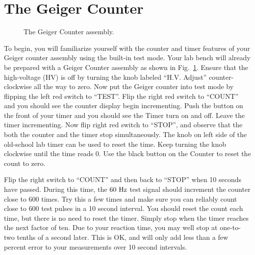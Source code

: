 \section{The Geiger Counter}


\begin{figure}[htbp]
\begin{center}
\caption{\label{fig:geigersetup} The Geiger Counter assembly.}
\end{center}
\end{figure}

To begin, you will familiarize yourself with the counter and timer
features of your Geiger counter assembly using the built-in test mode.
Your lab bench will already be prepared with a Geiger Counter assembly
as shown in Fig.~\ref{fig:geigersetup}.  Ensure that the high-voltage
(HV) is off by turning the knob labeled ``H.V. Adjust''
counter-clockwise all the way to zero.  Now put the Geiger counter
into test mode by flipping the left red switch to ``TEST''.  Flip the
right red switch to ``COUNT'' and you should see the counter display
begin incrementing.  Push the button on the front of your timer and
you should see the Timer turn on and off.  Leave the timer
incrementing.  Now flip right red switch to ``STOP'', and observe that
the both the counter and the timer stop simultaneously.  The knob on
left side of the old-school lab timer can be used to reset the time.
Keep turning the knob clockwise until the time reads 0.  Use the black
button on the Counter to reset the count to zero.

Flip the right switch to ``COUNT'' and then back to ``STOP'' when 10
seconds have passed.  During this time, the $60~\rm Hz$ test signal
should increment the counter close to 600 times.  Try this a few times
and make sure you can reliably count close to $600$ test pulses in a
10 second interval.  You should reset the count each time, but there
is no need to reset the timer.  Simply stop when the timer reaches the
next factor of ten.  Due to your reaction time, you may well stop at
one-to-two tenths of a second later.  This is OK, and will only add
less than a few percent error to your measurements over 10 second
intervals.

